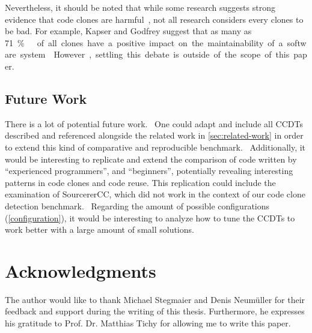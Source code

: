 \documentclass[10pt,journal,compsoc]{IEEEtran}
\begin{document}
Nevertheless, it should be noted that while some research suggests strong evidence that code clones are harmful~\cite{juergens2009code},
not all research considers every clones to be bad. For example, Kapser and Godfrey suggest that as many as \qty{71}\percent\ of all clones have a positive impact on the maintainability of a software system~\cite{kapser2008cloning}.
However, settling this debate is outside of the scope of this paper.

\subsection{Future Work}
There is a lot of potential future work.
\textbullet~One could adapt and include all CCDTs described and referenced alongside the related work in \cref{sec:related-work} in order to extend this kind of comparative and reproducible benchmark.
\textbullet~Additionally, it would be interesting to replicate and extend the comparison of code written by \enquote{experienced programmers}, and \enquote{beginners}, potentially revealing interesting patterns in code clones and code reuse.
This replication could include the examination of SourcererCC, which did not work in the context of our code clone detection benchmark.
\textbullet~Regarding the amount of possible configurations (\cref{configuration}), it would be interesting to analyze how to tune the CCDTs to work better with a large amount of small solutions.

\appendices



\section*{Acknowledgments}
The author would like to thank Michael Stegmaier and Denis Neumüller for their feedback and support during the writing of this thesis. Furthermore, he expresses his gratitude to Prof. Dr. Matthias Tichy for allowing me to write this paper.

\ifCLASSOPTIONcaptionsoff
  \newpage
\fi




\end{document}
